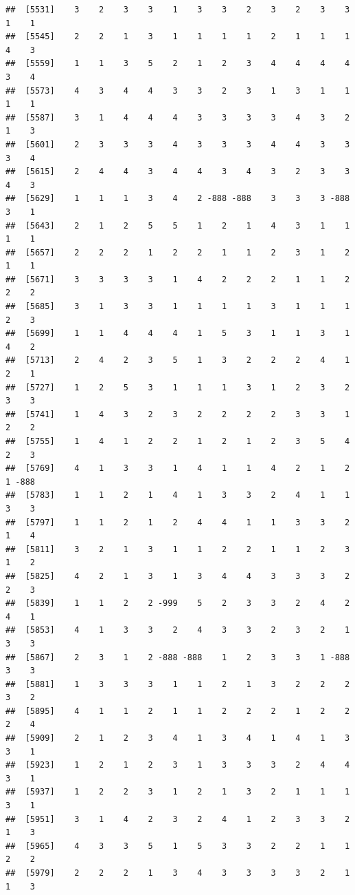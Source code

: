 \documentclass[
  12pt,
  openany]{book}
\begin{document}
\begin{verbatim}
##  [5531]    3    2    3    3    1    3    3    2    3    2    3    3    1    1
##  [5545]    2    2    1    3    1    1    1    1    2    1    1    1    4    3
##  [5559]    1    1    3    5    2    1    2    3    4    4    4    4    3    4
##  [5573]    4    3    4    4    3    3    2    3    1    3    1    1    1    1
##  [5587]    3    1    4    4    4    3    3    3    3    4    3    2    1    3
##  [5601]    2    3    3    3    4    3    3    3    4    4    3    3    3    4
##  [5615]    2    4    4    3    4    4    3    4    3    2    3    3    4    3
##  [5629]    1    1    1    3    4    2 -888 -888    3    3    3 -888    3    1
##  [5643]    2    1    2    5    5    1    2    1    4    3    1    1    1    1
##  [5657]    2    2    2    1    2    2    1    1    2    3    1    2    1    1
##  [5671]    3    3    3    3    1    4    2    2    2    1    1    2    2    2
##  [5685]    3    1    3    3    1    1    1    1    3    1    1    1    2    3
##  [5699]    1    1    4    4    4    1    5    3    1    1    3    1    4    2
##  [5713]    2    4    2    3    5    1    3    2    2    2    4    1    2    1
##  [5727]    1    2    5    3    1    1    1    3    1    2    3    2    3    3
##  [5741]    1    4    3    2    3    2    2    2    2    3    3    1    2    2
##  [5755]    1    4    1    2    2    1    2    1    2    3    5    4    2    3
##  [5769]    4    1    3    3    1    4    1    1    4    2    1    2    1 -888
##  [5783]    1    1    2    1    4    1    3    3    2    4    1    1    3    3
##  [5797]    1    1    2    1    2    4    4    1    1    3    3    2    1    4
##  [5811]    3    2    1    3    1    1    2    2    1    1    2    3    1    2
##  [5825]    4    2    1    3    1    3    4    4    3    3    3    2    2    3
##  [5839]    1    1    2    2 -999    5    2    3    3    2    4    2    4    1
##  [5853]    4    1    3    3    2    4    3    3    2    3    2    1    3    3
##  [5867]    2    3    1    2 -888 -888    1    2    3    3    1 -888    3    3
##  [5881]    1    3    3    3    1    1    2    1    3    2    2    2    3    2
##  [5895]    4    1    1    2    1    1    2    2    2    1    2    2    2    4
##  [5909]    2    1    2    3    4    1    3    4    1    4    1    3    3    1
##  [5923]    1    2    1    2    3    1    3    3    3    2    4    4    3    1
##  [5937]    1    2    2    3    1    2    1    3    2    1    1    1    3    1
##  [5951]    3    1    4    2    3    2    4    1    2    3    3    2    1    3
##  [5965]    4    3    3    5    1    5    3    3    2    2    1    1    2    2
##  [5979]    2    2    2    1    3    4    3    3    3    3    2    1    1    3

\end{verbatim}
\end{document}
